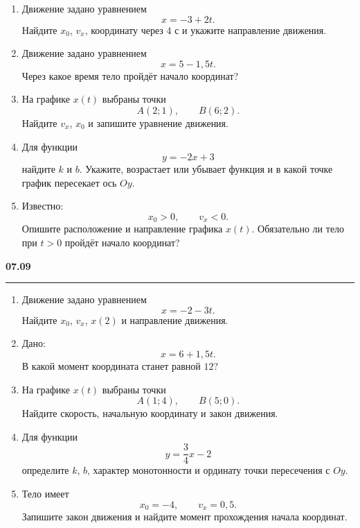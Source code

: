 \documentclass[a4paper,12pt]{article}
\newcommand{\daytitle}[1]{%
  \vspace{0.7em}
  {\large\bfseries\color{darkaccent}#1}\par
  \vspace{0.2em}
  \noindent\color{accent}\rule{\linewidth}{0.4pt}\color{textgray}
  \vspace{0.3em}
}
\begin{document}
\begin{enumerate}[label=\arabic*),leftmargin=*,itemsep=0.9em]

\item Движение задано уравнением
\[
x=-3+2t.
\]
Найдите \(x_0\), \(v_x\), координату через \(4\) с и укажите направление движения.

\item Движение задано уравнением
\[
x=5-1{,}5t.
\]
Через какое время тело пройдёт начало координат?

\item На графике \(x(t)\) выбраны точки
\[
A(2;1),\qquad B(6;2).
\]
Найдите \(v_x\), \(x_0\) и запишите уравнение движения.

\item Для функции
\[
y=-2x+3
\]
найдите \(k\) и \(b\). Укажите, возрастает или убывает функция и в какой точке график пересекает ось \(Oy\).

\item Известно:
\[
x_0>0,\qquad v_x<0.
\]
Опишите расположение и направление графика \(x(t)\). Обязательно ли тело при \(t>0\) пройдёт начало координат?

\end{enumerate}


\daytitle{07.09}

\begin{enumerate}[label=\arabic*),leftmargin=*,itemsep=0.9em]

\item Движение задано уравнением
\[
x=-2-3t.
\]
Найдите \(x_0\), \(v_x\), \(x(2)\) и направление движения.

\item Дано:
\[
x=6+1{,}5t.
\]
В какой момент координата станет равной \(12\)?

\item На графике \(x(t)\) выбраны точки
\[
A(1;4),\qquad B(5;0).
\]
Найдите скорость, начальную координату и закон движения.

\item Для функции
\[
y=\frac34x-2
\]
определите \(k\), \(b\), характер монотонности и ординату точки пересечения с \(Oy\).

\item Тело имеет
\[
x_0=-4,\qquad v_x=0{,}5.
\]
Запишите закон движения и найдите момент прохождения начала координат.

\end{enumerate}
\end{document}
